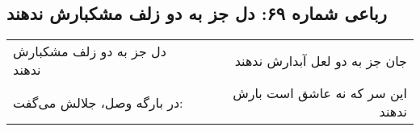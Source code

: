 \begin{center}
\section*{رباعی شماره ۶۹: دل جز به دو زلف مشکبارش ندهند}
\label{sec:069}
\begin{longtable}{l p{0.5cm} r}
دل جز به دو زلف مشکبارش ندهند
&&
جان جز به دو لعل آبدارش ندهند
\\
در بارگه وصل، جلالش می‌گفت:
&&
این سر که نه عاشق است بارش ندهند
\\
\end{longtable}
\end{center}
